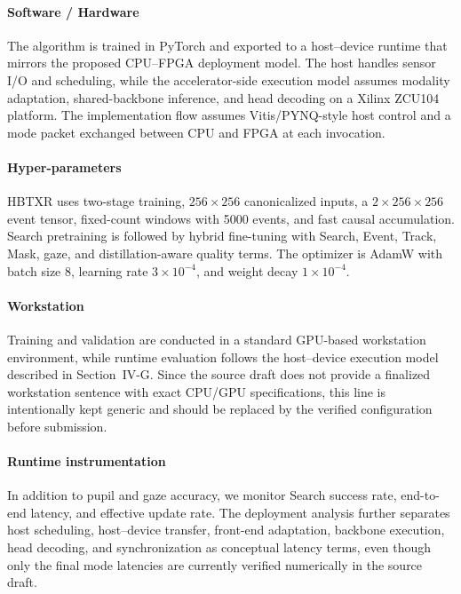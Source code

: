 \documentclass[journal]{IEEEtran}
\begin{document}
\paragraph*{Software / Hardware}
The algorithm is trained in PyTorch and exported to a host--device runtime that mirrors the proposed CPU--FPGA deployment model. The host handles sensor I/O and scheduling, while the accelerator-side execution model assumes modality adaptation, shared-backbone inference, and head decoding on a Xilinx ZCU104 platform. The implementation flow assumes Vitis/PYNQ-style host control and a mode packet exchanged between CPU and FPGA at each invocation.

\paragraph*{Hyper-parameters}
HBTXR uses two-stage training, $256\times256$ canonicalized inputs, a $2\times256\times256$ event tensor, fixed-count windows with 5000 events, and fast causal accumulation. Search pretraining is followed by hybrid fine-tuning with Search, Event, Track, Mask, gaze, and distillation-aware quality terms. The optimizer is AdamW with batch size 8, learning rate $3\times10^{-4}$, and weight decay $1\times10^{-4}$.

\paragraph*{Workstation}
Training and validation are conducted in a standard GPU-based workstation environment, while runtime evaluation follows the host--device execution model described in Section~IV-G. Since the source draft does not provide a finalized workstation sentence with exact CPU/GPU specifications, this line is intentionally kept generic and should be replaced by the verified configuration before submission.

\paragraph*{Runtime instrumentation}
In addition to pupil and gaze accuracy, we monitor Search success rate, end-to-end latency, and effective update rate. The deployment analysis further separates host scheduling, host--device transfer, front-end adaptation, backbone execution, head decoding, and synchronization as conceptual latency terms, even though only the final mode latencies are currently verified numerically in the source draft.
\end{document}
